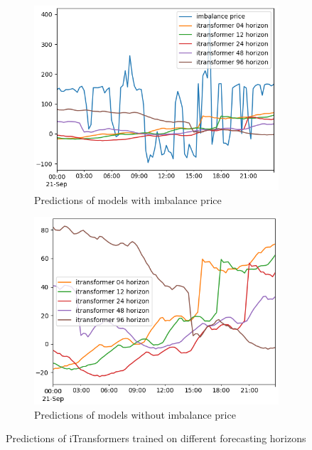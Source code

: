 \documentclass[class=scrbook, crop=false]{standalone}
\begin{document}
\begin{figure}
  \centering
\begin{subfigure}{0.45\textwidth}
  \includegraphics[width=\linewidth]{../images/results/itransformer_horizon_lengths.png}
  \caption{Predictions of models with imbalance price}
\end{subfigure}
\begin{subfigure}{0.45\textwidth}
  \includegraphics[width=\linewidth]{../images/results/itransformer_horizon_lengths_alone.png}
  \caption{Predictions of models without imbalance price}
\end{subfigure}
\caption{Predictions of iTransformers trained on different forecasting horizons}
\label{fig:fig}
\end{figure}
\end{document}
